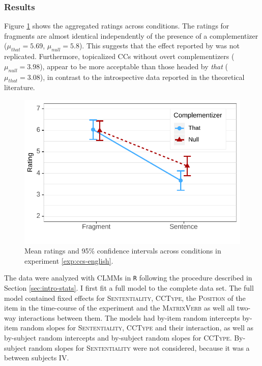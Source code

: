 \subsubsection{Results}\label{sec:ccs-english-results}

Figure \ref{fig:ccs-english-estimates} shows the aggregated ratings across conditions. The ratings for fragments are almost identical independently of the presence of a complementizer ($\mu_{that} = 5.69$, $\mu_{null} = 5.8$). This suggests that the effect reported by \citet{merchant.etal2013} was not replicated. Furthermore, topicalized CCs without overt complementizers ($\mu_{null} = 3.98$), appear to be more acceptable than those headed by \textit{that} ($\mu_{that} = 3.08$), in contrast to the introspective data reported in the theoretical literature.

\begin{figure}[t]
\includegraphics[scale=1]{figures/ex2b_ccs_en_estimates}
 \caption{Mean ratings and 95\% confidence intervals across conditions in experiment \ref{exp:ccs-english}. \label{fig:ccs-english-estimates}}
\end{figure}

The data were analyzed with CLMMs in \texttt{R} following the procedure described in Section \ref{sec:intro-stats}. I first fit a full model to the complete data set. The full model contained fixed effects for \textsc{Sententiality}, \textsc{CCType}, the \textsc{Position} of the item in the time-course of the experiment and the \textsc{MatrixVerb} as well all two-way interactions between them. The models had by-item random intercepts by-item random slopes for \textsc{Sententiality}, \textsc{CCType} and their interaction, as well as by-subject random intercepts and by-subject random slopes for \textsc{CCType}. By-subject random slopes for \textsc{Sententiality} were not considered, because it was a between subjects IV. 


